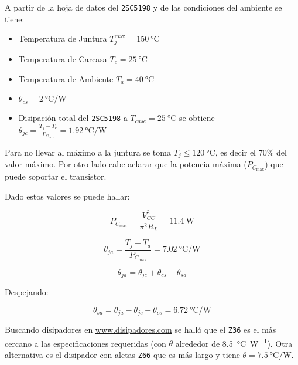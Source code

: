 	A partir de la hoja de datos del \texttt{2SC5198} y de las condiciones del ambiente se tiene:
	\begin{itemize}
		\item  Temperatura de Juntura $T^{\max}_j = \SI{150}{\celsius} $
		\item  Temperatura de Carcasa $T_c = \SI{25}{\celsius} $
		\item  Temperatura de Ambiente $T_a = \SI{40}{\celsius} $
		\item  $\theta_{cs} = \SI{2}{\celsius\per\W}$ 
		\item  Disipación total del \texttt{2SC5198} a $T_{case} = \SI{25}{\celsius}$ se obtiene $\theta_{jc} =  \frac{T_j - T_c}{P_{C_{\max}}} =\SI{1.92}{\celsius\per\W}$ 
	\end{itemize}

		Para no llevar al máximo a la juntura se toma $T_j \leq \SI{120}{\celsius}$, es decir el 70\% del valor máximo. Por otro lado cabe aclarar que la potencia máxima ($P_{C_{\max}}$) que puede soportar el transistor.
		
	Dado estos valores se puede hallar:

	\begin{equation}
		P_{C_{\max}} = \frac{V^2_{CC}}{\pi^2 R_L} = \SI{11.4}{\W}
	\end{equation}

	\begin{equation}
		\theta_{ja} =  \frac{T_j - T_a}{P_{C_{\max}}} =\SI{7.02}{\celsius\per\W}
	\end{equation}
	

	\begin{equation}
		\theta_{ja} = \theta_{jc} + \theta_{cs} + \theta_{sa}
	\end{equation}

	Despejando:

	\begin{equation}
		\theta_{sa} = \theta_{ja} - \theta_{jc} - \theta_{cs} = \boxed{\SI{6.72}{\celsius\per\W}}
	\end{equation}

	Buscando disipadores en \url{www.disipadores.com} se halló que el \texttt{Z36} es el más cercano a las especificaciones requeridas (con $\theta$ alrededor de \SI{8.5}{\celsius\per\W}). Otra alternativa es el disipador con aletas \texttt{Z66} que es más largo y tiene $\theta = \SI{7.5}{\celsius\per\W}$.


